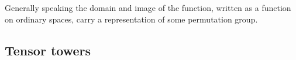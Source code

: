 \documentclass[reprint,twocolumn,amsmath,amssymb,aps]{revtex4-1}
\newcommand{\NN}{\mathcal{NN}}
\newcommand{\XX}{\mathcal{X}}
\newcommand{\YY}{\mathcal{Y}}
\newcommand{\X}{\mathbf{X}}
\newcommand{\Y}{\mathbf{Y}}
\begin{document}
Generally speaking the domain and image of the function, written as a function on ordinary spaces, carry a representation of some permutation group.
%
%
%
%
%
%
%
%
%
%
%
%
\subsection{Tensor towers}
\end{document}
